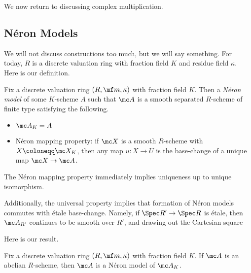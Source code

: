 \documentclass[../notes.tex]{subfiles}
\begin{document}
We now return to discussing complex multiplication.

\subsection{N\'eron Models}
We will not discuss constructions too much, but we will say something. For today, $R$ is a discrete valuation ring with fraction field $K$ and residue field $\kappa$. Here is our definition.
\begin{defihelper}
	Fix a discrete valuation ring $(R,\mf m,\kappa)$ with fraction field $K$. Then a \textit{N\'eron model} of some $K$-scheme $A$ such that $\mc A$ is a smooth separated $R$-scheme of finite type satisfying the following.
	\begin{itemize}
		\item $\mc A_K=A$
		\item N\'eron mapping property: if $\mc X$ is a smooth $R$-scheme with $X\coloneqq\mc X_K$, then any map $u\colon X\to U$ is the base-change of a unique map $\mc X\to\mc A$.
	\end{itemize}
\end{defihelper}
\begin{remark}
	The N\'eron mapping property immediately implies uniqueness up to unique isomorphism.
\end{remark}
\begin{remark}
	Additionally, the universal property implies that formation of N\'eron models commutes with \'etale base-change. Namely, if $\Spec R'\to\Spec R$ is \'etale, then $\mc A_{R'}$ continues to be smooth over $R'$, and drawing out the Cartesian square
\end{remark}
Here is our result.
\begin{proposition}
	Fix a discrete valuation ring $(R,\mf m,\kappa)$ with fraction field $K$. If $\mc A$ is an abelian $R$-scheme, then $\mc A$ is a N\'eron model of $\mc A_K$.
\end{proposition}
\end{document}
